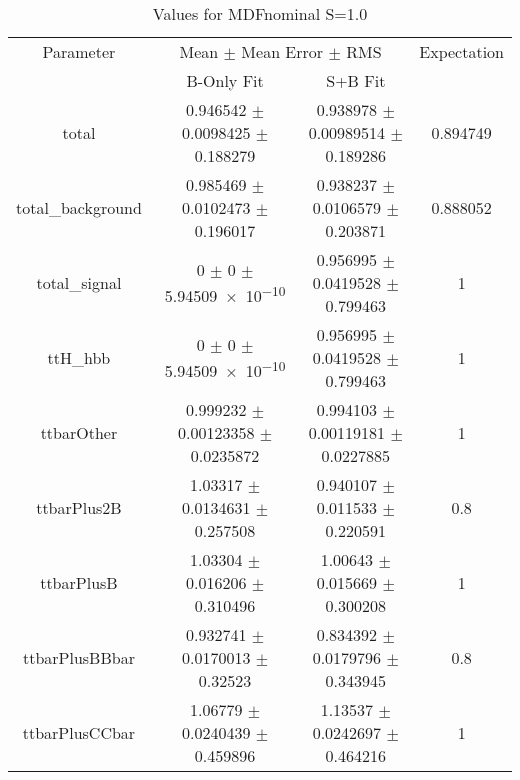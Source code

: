 \begin{table}
\centering
\caption{Values for MDFnominal S=1.0}
\begin{tabular}{cccc}
\toprule
Parameter & \multicolumn{2}{c}{Mean $\pm$ Mean Error $\pm$ RMS} & Expectation\\
 & B-Only Fit & S+B Fit & \\
\midrule
total & \num{0.946542} $\pm$ \num{0.0098425} $\pm$ \num{0.188279} & \num{0.938978} $\pm$ \num{0.00989514} $\pm$ \num{0.189286} & \num{0.894749}\\
total\_background & \num{0.985469} $\pm$ \num{0.0102473} $\pm$ \num{0.196017} & \num{0.938237} $\pm$ \num{0.0106579} $\pm$ \num{0.203871} & \num{0.888052}\\
total\_signal & \num{0} $\pm$ \num{0} $\pm$ \num{5.94509e-10} & \num{0.956995} $\pm$ \num{0.0419528} $\pm$ \num{0.799463} & \num{1}\\
ttH\_hbb & \num{0} $\pm$ \num{0} $\pm$ \num{5.94509e-10} & \num{0.956995} $\pm$ \num{0.0419528} $\pm$ \num{0.799463} & \num{1}\\
ttbarOther & \num{0.999232} $\pm$ \num{0.00123358} $\pm$ \num{0.0235872} & \num{0.994103} $\pm$ \num{0.00119181} $\pm$ \num{0.0227885} & \num{1}\\
ttbarPlus2B & \num{1.03317} $\pm$ \num{0.0134631} $\pm$ \num{0.257508} & \num{0.940107} $\pm$ \num{0.011533} $\pm$ \num{0.220591} & \num{0.8}\\
ttbarPlusB & \num{1.03304} $\pm$ \num{0.016206} $\pm$ \num{0.310496} & \num{1.00643} $\pm$ \num{0.015669} $\pm$ \num{0.300208} & \num{1}\\
ttbarPlusBBbar & \num{0.932741} $\pm$ \num{0.0170013} $\pm$ \num{0.32523} & \num{0.834392} $\pm$ \num{0.0179796} $\pm$ \num{0.343945} & \num{0.8}\\
ttbarPlusCCbar & \num{1.06779} $\pm$ \num{0.0240439} $\pm$ \num{0.459896} & \num{1.13537} $\pm$ \num{0.0242697} $\pm$ \num{0.464216} & \num{1}\\
\bottomrule
\end{tabular}
\end{table}